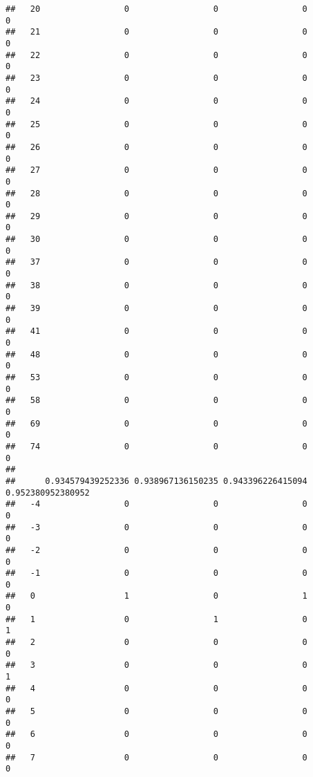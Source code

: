 \documentclass[]{article}
\begin{document}
\begin{verbatim}
##   20                 0                 0                 0                 0
##   21                 0                 0                 0                 0
##   22                 0                 0                 0                 0
##   23                 0                 0                 0                 0
##   24                 0                 0                 0                 0
##   25                 0                 0                 0                 0
##   26                 0                 0                 0                 0
##   27                 0                 0                 0                 0
##   28                 0                 0                 0                 0
##   29                 0                 0                 0                 0
##   30                 0                 0                 0                 0
##   37                 0                 0                 0                 0
##   38                 0                 0                 0                 0
##   39                 0                 0                 0                 0
##   41                 0                 0                 0                 0
##   48                 0                 0                 0                 0
##   53                 0                 0                 0                 0
##   58                 0                 0                 0                 0
##   69                 0                 0                 0                 0
##   74                 0                 0                 0                 0
##     
##      0.934579439252336 0.938967136150235 0.943396226415094 0.952380952380952
##   -4                 0                 0                 0                 0
##   -3                 0                 0                 0                 0
##   -2                 0                 0                 0                 0
##   -1                 0                 0                 0                 0
##   0                  1                 0                 1                 0
##   1                  0                 1                 0                 1
##   2                  0                 0                 0                 0
##   3                  0                 0                 0                 1
##   4                  0                 0                 0                 0
##   5                  0                 0                 0                 0
##   6                  0                 0                 0                 0
##   7                  0                 0                 0                 0

\end{verbatim}
\end{document}

